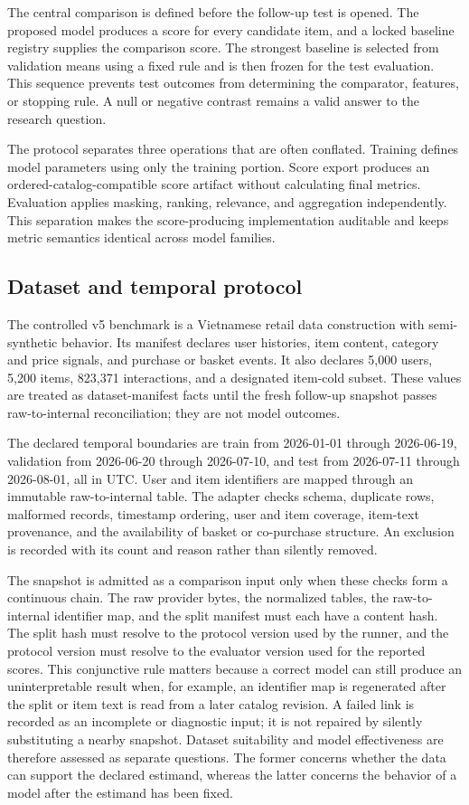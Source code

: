 \documentclass[10pt,a4paper]{article}
\begin{document}
The central comparison is defined before the follow-up test is opened. The
proposed model produces a score for every candidate item, and a locked baseline
registry supplies the comparison score. The strongest baseline is selected from
validation means using a fixed rule and is then frozen for the test evaluation.
This sequence prevents test outcomes from determining the comparator, features,
or stopping rule. A null or negative contrast remains a valid answer to the
research question.

The protocol separates three operations that are often conflated. Training
defines model parameters using only the training portion. Score export produces
an ordered-catalog-compatible score artifact without calculating final metrics.
Evaluation applies masking, ranking, relevance, and aggregation independently.
This separation makes the score-producing implementation auditable and keeps
metric semantics identical across model families.

\subsection{Dataset and temporal protocol}

The controlled v5 benchmark is a Vietnamese retail data construction with
semi-synthetic behavior. Its manifest declares user histories, item content,
category and price signals, and purchase or basket events. It also declares
5,000 users, 5,200 items, 823,371 interactions, and a designated item-cold
subset. These values are treated as dataset-manifest facts until the fresh
follow-up snapshot passes raw-to-internal reconciliation; they are not model
outcomes.

The declared temporal boundaries are train from 2026-01-01 through 2026-06-19,
validation from 2026-06-20 through 2026-07-10, and test from 2026-07-11
through 2026-08-01, all in UTC. User and item identifiers are mapped through an
immutable raw-to-internal table. The adapter checks schema, duplicate rows,
malformed records, timestamp ordering, user and item coverage, item-text
provenance, and the availability of basket or co-purchase structure. An
exclusion is recorded with its count and reason rather than silently removed.

The snapshot is admitted as a comparison input only when these checks form a
continuous chain. The raw provider bytes, the normalized tables, the
raw-to-internal identifier map, and the split manifest must each have a
content hash. The split hash must resolve to the protocol version used by the
runner, and the protocol version must resolve to the evaluator version used for
the reported scores. This conjunctive rule matters because a correct model
can still produce an uninterpretable result when, for example, an identifier
map is regenerated after the split or item text is read from a later catalog
revision. A failed link is recorded as an incomplete or diagnostic input; it
is not repaired by silently substituting a nearby snapshot. Dataset
suitability and model effectiveness are therefore assessed as separate
questions. The former concerns whether the data can support the declared
estimand, whereas the latter concerns the behavior of a model after the
estimand has been fixed.
\end{document}
